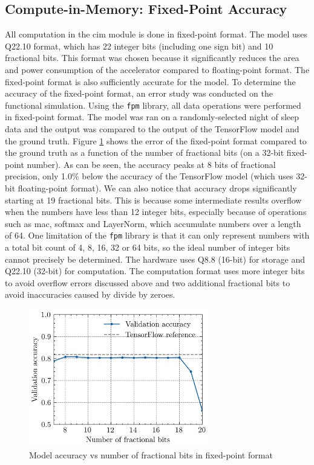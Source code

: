\subsection{Compute-in-Memory: Fixed-Point Accuracy}
All computation in the \ac{cim} module is done in fixed-point format. The model uses Q22.10 format, which has 22 integer bits (including one sign bit) and 10 fractional bits.
This format was chosen because it significantly reduces the area and power consumption of the accelerator compared to floating-point format. The fixed-point format is also
sufficiently accurate for the model. To determine the accuracy of the fixed-point format, an error study was conducted on the functional simulation. Using the \texttt{fpm} library,
all data operations were performed in fixed-point format. The model was ran on a randomly-selected night of sleep data and the output was compared to the output of the TensorFlow model
and the ground truth. Figure \ref{fig:fixed_point_error} shows the error of the fixed-point format compared to the ground truth as a function of the number of fractional bits (on a 32-bit
fixed-point number). As can be seen, the accuracy peaks at 8 bits of fractional precision, only 1.0\% below the accuracy of the TensorFlow model (which uses 32-bit floating-point format).
We can also notice that accuracy drops significantly starting at 19 fractional bits. This is because some intermediate results overflow when the numbers have less than 12 integer bits,
especially because of operations such as \ac{mac}, softmax and LayerNorm, which accumulate numbers over a length of 64. One limitation of the \texttt{fpm} library is that it can only 
represent numbers with a total bit count of 4, 8, 16, 32 or 64 bits, so the ideal number of integer bits cannot precisely be determined. The hardware uses Q8.8 (16-bit) for storage and
Q22.10 (32-bit) for computation. The computation format uses more integer bits to avoid overflow errors discussed above and two additional fractional bits to avoid inaccuracies caused by
divide by zeroes.

\begin{figure}
    \centering
    \includegraphics[width=0.7\textwidth]{assets/fixed_point_acc/fixed_point_acc.png}
    \caption{Model accuracy vs number of fractional bits in fixed-point format}
    \label{fig:fixed_point_error}
\end{figure}

